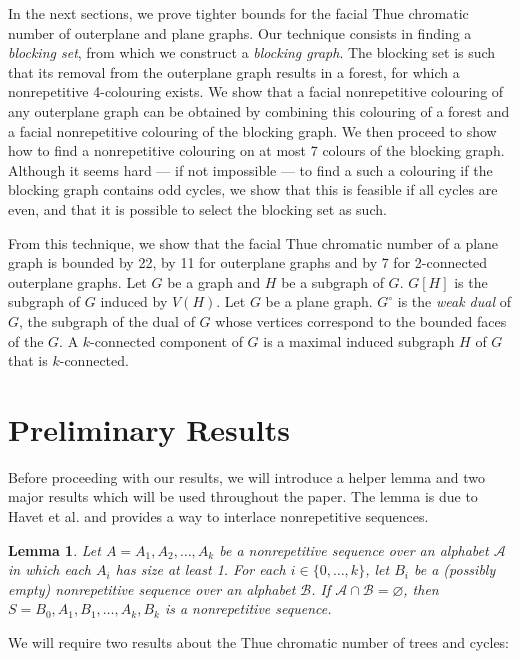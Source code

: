 \documentclass{patmorin}
\let\emptyset\varnothing
\newcommand{\wdual}[1]{#1^{\circ}}
\newtheorem{lemma}[theorem]{Lemma}
\begin{document}
In the next sections, we prove tighter bounds for the facial Thue chromatic number of outerplane and plane graphs. Our technique consists in finding a \emph{blocking set}, from which we construct a \emph{blocking graph}. The blocking set is such that its removal from the outerplane graph results in a forest, for which a nonrepetitive 4-colouring exists. We show that a facial nonrepetitive colouring of any outerplane graph can be obtained by combining this colouring of a forest and a facial nonrepetitive colouring of the blocking graph.
We then proceed to show how to find a nonrepetitive colouring on at most 7 colours of the blocking graph. Although it seems hard --- if not impossible --- to find a such a colouring if the blocking graph contains odd cycles, we show that this is feasible if all cycles are even, and that it is possible to select the blocking set as such.

From this technique, we show that the facial Thue chromatic number of a plane graph is bounded by 22, by 11 for outerplane graphs and by 7 for 2-connected outerplane graphs. Let $G$ be a graph and $H$ be a subgraph of $G$. $G[H]$ is the subgraph of $G$ induced by $V(H)$. Let $G$ be a plane graph. $\wdual{G}$ is the \emph{weak dual} of $G$, the subgraph of the dual of $G$ whose vertices correspond to the bounded faces of the $G$. A $k$-connected component of $G$ is a maximal induced subgraph $H$ of $G$ that is $k$-connected.


\section{Preliminary Results}

Before proceeding with our results, we will introduce a helper lemma and two major results which will be used throughout the paper. The lemma is due to Havet et al. \cite{havet2011facial} and provides a way to interlace nonrepetitive sequences.

\begin{lemma}
\label{lem:nonrep_alternate}
 Let $A=A_1,A_2,\ldots,A_k$ be a nonrepetitive sequence over an alphabet $\mathcal{A}$ in which each $A_i$ has size at least 1. For each $i \in \{0,\ldots,k\}$, let $B_i$ be a (possibly empty) nonrepetitive sequence over an alphabet $\mathcal{B}$. If $\mathcal{A} \cap \mathcal{B} = \emptyset$, then
 $ S = B_0, A_1, B_1, \ldots, A_k, B_k$ is a nonrepetitive sequence.
\end{lemma}

We will require two results about the Thue chromatic number of trees and cycles:
\end{document}
